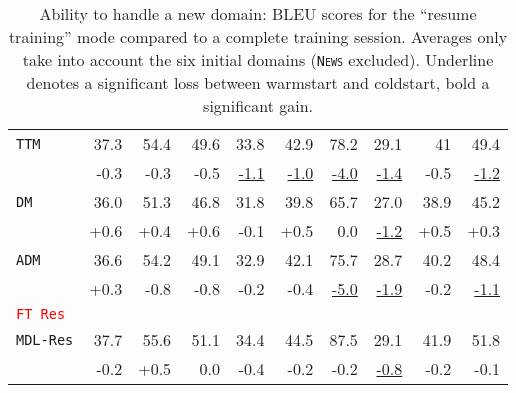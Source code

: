 \documentclass[11pt,a4paper]{article}
\newcommand{\fyDone}[1]{\done[FY]\Todo[FY:]{\textcolor{orange}{#1}}}
\newcommand{\revision}[1]{\textcolor{red}{#1}}
\newcommand{\domain}[1]{\texttt{\textsc{#1}}}
\newcommand{\system}[1]{\texttt{{#1}}}
\newcommand{\SW}[1]{\underline{#1}}
\begin{document}
\begin{table*}
\begin{tabular}{|p{2.5cm}|*{9}{r|}}
    \system{TTM}           &  37.3 & 54.4   & 49.6    & 33.8  &  42.9  &78.2  & 29.1 & 41 & 49.4\\[-2pt]
                    & \scriptsize -0.3  & \scriptsize -0.3  & \scriptsize -0.5    & \scriptsize \SW{-1.1}  &  \scriptsize \SW{-1.0}  & \scriptsize \SW{-4.0}  & \scriptsize \SW{-1.4}& \scriptsize -0.5 & \scriptsize \SW{-1.2}\\
    
    \system{DM}            &36.0 &51.3&46.8&31.8&39.8&65.7&27.0 & 38.9 & 45.2\\[-2pt]
                   & \scriptsize +0.6& \scriptsize +0.4& \scriptsize +0.6& \scriptsize -0.1& \scriptsize +0.5 & \scriptsize 0.0& \scriptsize \SW{-1.2}& \scriptsize +0.5 & \scriptsize +0.3\\    
    
    \system{ADM}          &36.6&54.2&49.1&32.9&42.1&75.7&28.7 & 40.2 & 48.4 \\[-2pt]
                   & \scriptsize +0.3 & \scriptsize -0.8 & \scriptsize -0.8 & \scriptsize -0.2 & \scriptsize -0.4 & \scriptsize \SW{-5.0} & \scriptsize \SW{-1.9} & \scriptsize -0.2 & \scriptsize \SW{-1.1}\\
    
    \revision{\system{FT Res}}  &  \\
    
    \system{MDL-Res}    &37.7   & 55.6   & 51.1   & 34.4  & 44.5  & 87.5  & 29.1 & 41.9 & 51.8 \\[-2pt]
                        & \scriptsize -0.2 & \scriptsize +0.5 & \scriptsize 0.0 & \scriptsize -0.4  &  \scriptsize -0.2 & \scriptsize -0.2 & \scriptsize \SW{-0.8} & \scriptsize -0.2 & \scriptsize -0.1 \\
     \hline
  \end{tabular}
  \caption{Ability to handle a new domain: BLEU scores for the ``resume training'' mode compared to a complete training session. Averages only take into account the six initial domains (\domain{News} excluded). Underline denotes a significant loss between warmstart and coldstart, bold a significant gain.}
  \label{tab:warmrestart}
  \fyDone{Fill the table, significancy testing against initial learning condition, for each domain, and averages ? }
  \fyDone{Need correct number / differences for Mixed-Nat}
  \fyDone{averages include one more domain ? No for comparison}
  \fyDone{i used smaller number for differences (easier to read...)}
\end{table*}
\end{document}
